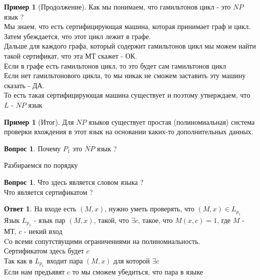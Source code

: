 \documentclass{beamer}
\theoremstyle{plain}
\theoremstyle{definition}
\newtheorem{Q}[thm]{Вопрос}
\newtheorem{A}[thm]{Ответ}
\newtheorem{ex}[thm]{Пример}
\begin{document}
\begin{frame}
	\begin{ex}[Продолжение]
	    Как мы понимаем, что гамильтонов цикл - это $NP$ язык ? \\
	    Мы знаем, что есть сертифицирующая машина, которая принимает граф и цикл. Затем убеждается, что этот цикл лежит в графе. \\
	    Дальше для каждого графа, который содержит гамильтонов цикл мы можем найти такой сертификат, что эта МТ скажет - ОК. \\
	    Если в графе есть гамильтонов цикл, то это будет сам гамильтонов цикл \\
	    Если нет гамильтонового цикла, то мы никак не сможем заставить эту машину сказать - ДА. \\
	    То есть такая сертифицирующая машина существует и поэтому утверждаем, что $L$ - $NP$ язык 
	\end{ex}
\end{frame}

\begin{frame}
	\begin{ex}[Итог]
	    Для $NP$ языков существует простая (полиномиальная) система проверки вхождения в этот язык на основании каких-то дополнительных данных.
	\end{ex}
\end{frame}

\begin{frame}
	\begin{Q}
	    Почему $P_1$ это $NP$ язык ?
	\end{Q}
\end{frame}

\begin{frame}
    Разбираемся по порядку
	\begin{Q}
	    Что здесь является словом языка ? \\
	    Что является сертификатом ?	
	\end{Q}

	\begin{A}
	    На входе есть $(M,x)$, нужно уметь проверять, что $(M,x)\in L_{p_1}$ \\
	    Язык $L_{p_1}$ - язык пар $(M,x)$, такой, что $\exists c$, такое, что $M(x,c)=1$, где $M$ - МТ, $c$ - некий вход \\
	    Cо всеми сопутствущими ограничениями на полиномиальность. \\
	    Сертификатом здесь будет $c$ \\
	    Так как в $L_{p_1}$ входит пара $(M,x)$ для которой $\exists c$ \\ Если нам предъявят $c$ то мы сможем убедиться, что пара в языке
	\end{A}
\end{frame}
\end{document}
